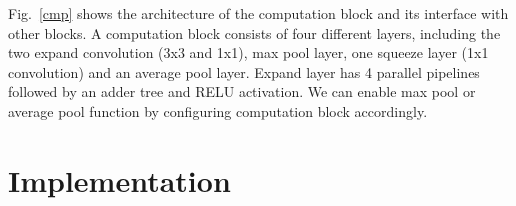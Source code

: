 \documentclass[conference]{IEEEtran}
\begin{document}
Fig.~\ref{cmp} shows the architecture of the computation block and its interface with other blocks. A computation block consists of four different layers, including the two expand convolution (3x3 and 1x1), max pool layer, one squeeze layer (1x1 convolution) and an average pool layer. Expand layer has 4 parallel pipelines followed by an adder tree and RELU activation. We can enable max pool or average pool function by configuring computation block accordingly.








\section{Implementation}
\end{document}
